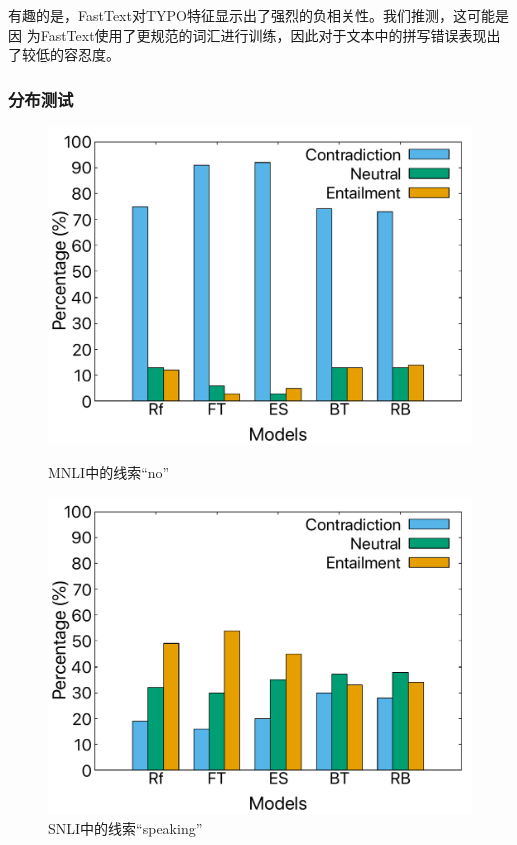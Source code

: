 有趣的是，FastText对TYPO特征显示出了强烈的负相关性。我们推测，这可能是因
为FastText使用了更规范的词汇进行训练，因此对于文本中的拼写错误表现出了较低的容忍度。

\subsubsection*{分布测试}
\begin{figure}[th]
    \centering
    \begin{minipage}[b]{0.45\linewidth}
    \centering
    \includegraphics[width=\columnwidth]{figures/emnlp/no-mnli.pdf}
    \caption*{MNLI中的线索``no''} 
    \label{fig4:cue_no} 
    \end{minipage}
    \hspace{0.5cm} 
    \begin{minipage}[b]{0.45\linewidth} 
    \centering 
    \includegraphics[width=\columnwidth]{figures/emnlp/speaking-snli.pdf} 
    \caption*{SNLI中的线索``speaking''}
    \label{fig4:cue_speaking}
    \end{minipage}
    

\end{figure}
